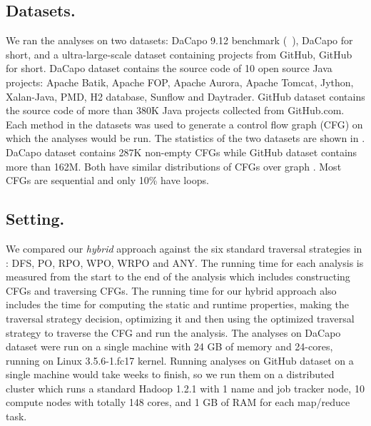 \subsection{Datasets.} We ran the analyses on two datasets: DaCapo 9.12 benchmark (~\cite{blackburn2006dacapo}), 
DaCapo for short, and a ultra-large-scale dataset containing projects from
GitHub, GitHub for short.
%
DaCapo dataset contains the source code of 10 open source Java projects: 
Apache Batik, Apache FOP, Apache Aurora, Apache Tomcat, Jython, Xalan-Java, 
PMD, H2 database, Sunflow and Daytrader. GitHub dataset contains the 
source code of more than 380K Java projects collected from 
GitHub.com. Each method in the datasets was used to generate a control 
flow graph (CFG) on which the analyses would be run. The statistics of the 
two datasets are shown in . DaCapo dataset contains 
287K non-empty CFGs while GitHub dataset contains more than 162M. Both 
have similar distributions of CFGs over graph \graphprop{}. Most CFGs are sequential 
and only 10\% have loops.

\subsection{Setting.} We compared our \textit{hybrid} approach against the six 
standard traversal strategies in : DFS, PO, RPO, WPO, 
WRPO and ANY. The running time for each analysis is measured from the start 
to the end of the analysis which includes constructing CFGs and traversing 
CFGs. The running time for our hybrid approach also includes the time for 
computing the static and runtime properties, making the traversal strategy 
decision, optimizing it and then using the optimized traversal strategy to 
traverse the CFG and run the analysis.
%
The analyses on DaCapo dataset were run on  a single machine with 24 GB of 
memory and 24-cores, running on Linux 3.5.6-1.fc17 kernel. Running analyses 
on GitHub dataset on a single machine would take weeks to finish, so we 
run them on a distributed cluster which runs a  standard  Hadoop 1.2.1 
with 1 name and job tracker node, 10 compute nodes with totally 148 cores, 
and 1 GB of RAM for each map/reduce task.


